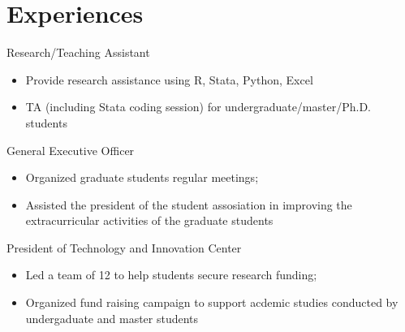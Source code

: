 \documentclass{resume}
\begin{document}

\section{Experiences}
Research/Teaching Assistant
\begin{itemize}
  \item Provide research assistance using R, Stata, Python, Excel
  \item TA (including Stata coding session) for undergraduate/master/Ph.D. students
\end{itemize}

General Executive Officer
\begin{itemize}
  \item Organized graduate students regular meetings;
  \item Assisted the president of the student assosiation in improving the extracurricular activities of the graduate students
\end{itemize}

President of Technology and Innovation Center
\begin{itemize}
  \item Led a team of 12 to help students secure research funding;
  \item Organized fund raising campaign to support acdemic studies conducted by undergaduate and master students
\end{itemize}
\end{document}
